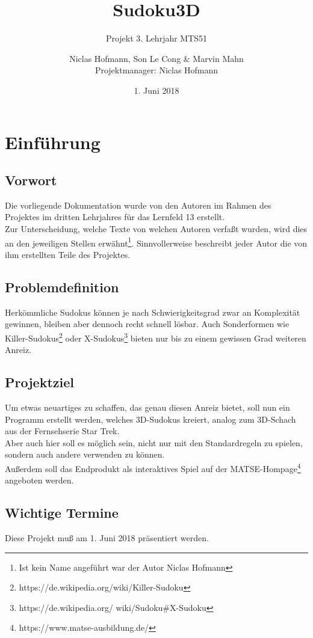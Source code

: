 \documentclass[a4paper,12pt]{scrreprt}
\title{Sudoku3D}
\subtitle{Projekt 3. Lehrjahr MTS51}
\author{Niclas Hofmann, Son Le Cong \& Marvin Mahn\\Projektmanager: Niclas Hofmann}
\date{1. Juni 2018}
\begin{document}
	\maketitle
	\tableofcontents

	\chapter{Einf\"uhrung}
	\section{Vorwort}
	Die vorliegende Dokumentation wurde von den Autoren im Rahmen des Projektes im dritten Lehrjahres
	f\"ur das Lernfeld 13 erstellt.\medskip \\
	Zur Unterscheidung, welche Texte von welchen Autoren verfa{\ss}t wurden, wird dies an den jeweiligen
	Stellen erw\"ahnt\footnote{Ist kein Name angef\"uhrt war der Autor Niclas Hofmann}.
	Sinnvollerweise beschreibt jeder Autor die von ihm erstellten Teile des Projektes.

	\section{Problemdefinition}
	Herk\"ommliche Sudokus k\"onnen je nach Schwierigkeitsgrad zwar an Komplexit\"at gewinnen,
	bleiben aber dennoch recht schnell l\"osbar. Auch Sonderformen wie Killer-Sudokus\footnote{
	https://de.wikipedia.org/wiki/Killer-Sudoku} oder X-Sudokus\footnote{https://de.wikipedia.org/
	wiki/Sudoku\#X-Sudoku} bieten nur bis zu einem gewissen Grad weiteren Anreiz.

	\section{Projektziel}
	Um etwas neuartiges zu schaffen, das genau diesen Anreiz bietet, soll nun ein Programm erstellt
	werden, welches 3D-Sudokus kreiert, analog zum 3D-Schach aus der Fernsehserie Star Trek.
	\medskip \\
	Aber auch hier soll es m\"oglich sein, nicht nur mit den Standardregeln zu spielen, sondern auch
	andere verwenden zu k\"onnen.\medskip \\
	Au{\ss}erdem soll das Endprodukt als interaktives Spiel auf der MATSE-Hompage\footnote{
	https://www.matse-ausbildung.de/} angeboten werden.

	\section{Wichtige Termine}
	Diese Projekt mu{\ss} am 1. Juni 2018 pr\"asentiert werden.
\end{document}
